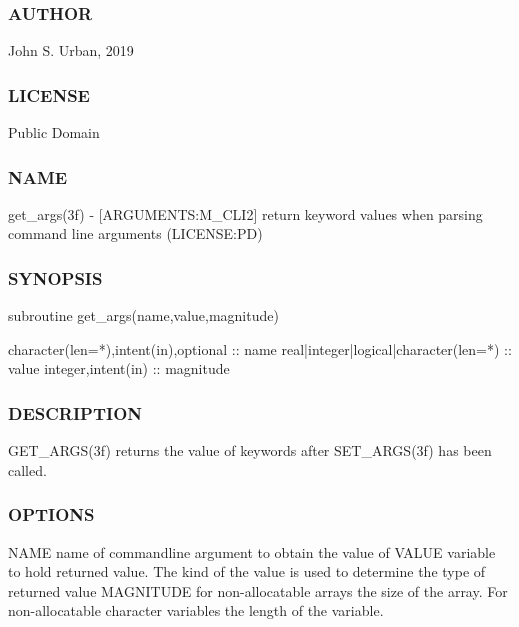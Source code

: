  \subsubsection*{A\+U\+T\+H\+OR}

John S. Urban, 2019 \subsubsection*{L\+I\+C\+E\+N\+SE}

Public Domain \subsubsection*{N\+A\+ME}

get\+\_\+args(3f) -\/ \mbox{[}A\+R\+G\+U\+M\+E\+N\+TS\+:M\+\_\+\+C\+L\+I2\mbox{]} return keyword values when parsing command line arguments (L\+I\+C\+E\+N\+SE\+:PD)

\subsubsection*{S\+Y\+N\+O\+P\+S\+IS}

\begin{DoxyVerb} subroutine get_args(name,value,magnitude)

  character(len=*),intent(in),optional  :: name
  real|integer|logical|character(len=*) :: value
  integer,intent(in) :: magnitude
\end{DoxyVerb}


\subsubsection*{D\+E\+S\+C\+R\+I\+P\+T\+I\+ON}

\begin{DoxyVerb} GET_ARGS(3f) returns the value of keywords after SET_ARGS(3f) has
 been called.
\end{DoxyVerb}


\subsubsection*{O\+P\+T\+I\+O\+NS}

\begin{DoxyVerb}  NAME       name of commandline argument to obtain the value of
  VALUE      variable to hold returned value. The kind of the value
             is used to determine the type of returned value
  MAGNITUDE  for non-allocatable arrays the size of the array. For
             non-allocatable character variables the length of the
             variable.
\end{DoxyVerb}
